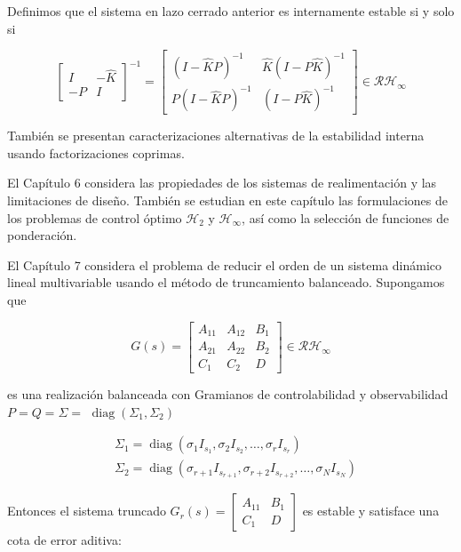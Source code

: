 \documentclass[11pt]{article}
\begin{document}
Definimos que el sistema en lazo cerrado anterior es internamente estable si y solo si

$$
\left[\begin{array}{cc}
I & -\hat{K} \\
-P & I
\end{array}\right]^{-1}=\left[\begin{array}{cc}
(I-\hat{K} P)^{-1} & \hat{K}(I-P \hat{K})^{-1} \\
P(I-\hat{K} P)^{-1} & (I-P \hat{K})^{-1}
\end{array}\right] \in \mathcal{R} \mathcal{H}_{\infty}
$$

También se presentan caracterizaciones alternativas de la estabilidad interna usando factorizaciones coprimas.

El Capítulo 6 considera las propiedades de los sistemas de realimentación y las limitaciones de diseño. También se estudian en este capítulo las formulaciones de los problemas de control óptimo $\mathcal{H}_{2}$ y $\mathcal{H}_{\infty}$, así como la selección de funciones de ponderación.

El Capítulo 7 considera el problema de reducir el orden de un sistema dinámico lineal multivariable usando el método de truncamiento balanceado. Supongamos que

$$
G(s)=\left[\begin{array}{cc|c}
A_{11} & A_{12} & B_{1} \\
A_{21} & A_{22} & B_{2} \\
\hline C_{1} & C_{2} & D
\end{array}\right] \in \mathcal{R} \mathcal{H}_{\infty}
$$

es una realización balanceada con Gramianos de controlabilidad y observabilidad $P=Q=\Sigma=$ $\operatorname{diag}\left(\Sigma_{1}, \Sigma_{2}\right)$

$$
\begin{aligned}
& \Sigma_{1}=\operatorname{diag}\left(\sigma_{1} I_{s_{1}}, \sigma_{2} I_{s_{2}}, \ldots, \sigma_{r} I_{s_{r}}\right) \\
& \Sigma_{2}=\operatorname{diag}\left(\sigma_{r+1} I_{s_{r+1}}, \sigma_{r+2} I_{s_{r+2}}, \ldots, \sigma_{N} I_{s_{N}}\right)
\end{aligned}
$$

Entonces el sistema truncado $G_{r}(s)=\left[\begin{array}{c|c}A_{11} & B_{1} \\ \hline C_{1} & D\end{array}\right]$ es estable y satisface una cota de error aditiva:
\end{document}
